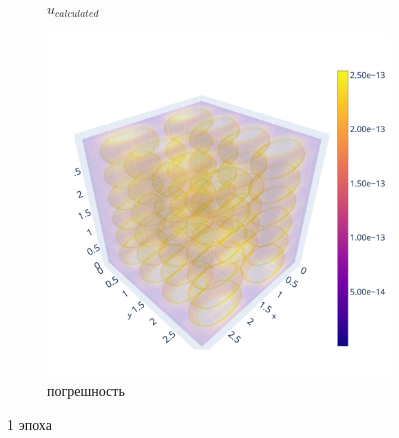 \documentclass[a4paper,hidelinks,12pt]{article}
\begin{document}
\begin{figure}[H]
\begin{subfigure}{.33\textwidth}
  \caption{$u_{calculated}$}
\end{subfigure}%
\begin{subfigure}{.33\textwidth}
  \centering
  \includegraphics[width=\linewidth]{pictures/1_Lpi_256_diff.png}
  \caption{погрешность}
\end{subfigure}%
\caption{1 эпоха}
\label{fig:fig}
\end{figure}
\end{document}
